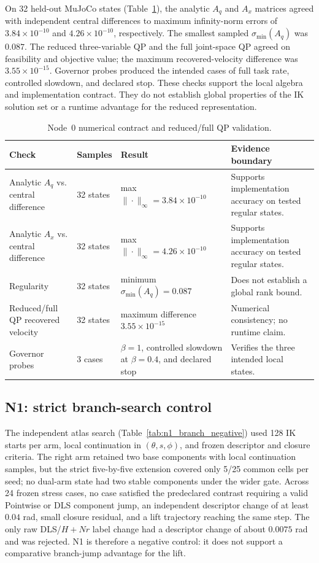 \documentclass[preprint,12pt]{elsarticle}
\begin{document}
On 32 held-out MuJoCo states (Table~\ref{tab:node0_validation}), the analytic $A_q$ and $A_x$ matrices agreed with independent central differences to maximum infinity-norm errors of $3.84\times10^{-10}$ and $4.26\times10^{-10}$, respectively. The smallest sampled $\sigma_{\min}(A_q)$ was $0.087$. The reduced three-variable QP and the full joint-space QP agreed on feasibility and objective value; the maximum recovered-velocity difference was $3.55\times10^{-15}$. Governor probes produced the intended cases of full task rate, controlled slowdown, and declared stop. These checks support the local algebra and implementation contract. They do not establish global properties of the IK solution set or a runtime advantage for the reduced representation.

\begin{table}[t]
\centering
\small
\caption{Node~0 numerical contract and reduced/full QP validation.}
\label{tab:node0_validation}
\begin{tabularx}{\textwidth}{@{}p{}p{}X X@{}}
\toprule
Check & Samples & Result & Evidence boundary \\
\midrule
Analytic $A_q$ vs. central difference & 32 states & max $\|\cdot\|_\infty=3.84\times10^{-10}$ & Supports implementation accuracy on tested regular states. \\
Analytic $A_x$ vs. central difference & 32 states & max $\|\cdot\|_\infty=4.26\times10^{-10}$ & Supports implementation accuracy on tested regular states. \\
Regularity & 32 states & minimum $\sigma_{\min}(A_q)=0.087$ & Does not establish a global rank bound. \\
Reduced/full QP recovered velocity & 32 states & maximum difference $3.55\times10^{-15}$ & Numerical consistency; no runtime claim. \\
Governor probes & 3 cases & $\beta=1$, controlled slowdown at $\beta=0.4$, and declared stop & Verifies the three intended local states. \\
\bottomrule
\end{tabularx}
\end{table}


\subsection{N1: strict branch-search control}

The independent atlas search (Table~\ref{tab:n1_branch_negative}) used 128 IK starts per arm, local continuation in $(\theta,s,\phi)$, and frozen descriptor and closure criteria. The right arm retained two base components with local continuation samples, but the strict five-by-five extension covered only 5/25 common cells per seed; no dual-arm state had two stable components under the wider gate. Across 24 frozen stress cases, no case satisfied the predeclared contrast requiring a valid Pointwise or DLS component jump, an independent descriptor change of at least $0.04$ rad, small closure residual, and a lift trajectory reaching the same step. The only raw DLS/$H+Nr$ label change had a descriptor change of about $0.0075$ rad and was rejected. N1 is therefore a negative control: it does not support a comparative branch-jump advantage for the lift.
\end{document}
